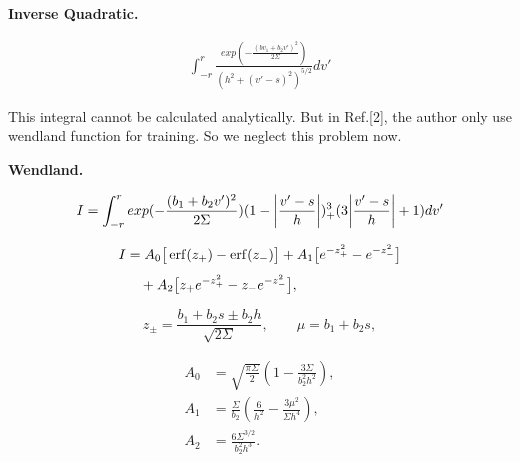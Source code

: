 \documentclass{article}
\begin{document}
	
	\textbf{Inverse Quadratic.}
	
	\begin{align}
	\int_{-r}^r\frac{exp(-\frac{(bv_1+b_2v')^2}{2\Sigma})}{(h^2+(v'-s)^2)^{5/2}}dv'
    \end{align}
    
    This integral cannot be calculated analytically. But in Ref.[2], the author only use wendland function for training. So we neglect this problem now.
     
    \textbf{Wendland.}

	\begin{align}
	I=\int_{-r}^rexp(-\frac{(b_1+b_2v')^2}{2\Sigma})(1-\abs{\frac{v'-s}{h}})^3_+(3\abs{\frac{v'-s}{h}}+1)dv'
    \end{align}

	\begin{equation}
		\begin{aligned}
			I
			&=
			A_0
			\big[
			\erf(z_+)-\erf(z_-)
			\big]
			+
			A_1
			\big[
			e^{-z_+^2}-e^{-z_-^2}
			\big]
			\\[4pt]
			&\quad+
			A_2
			\big[
			z_+ e^{-z_+^2}-z_- e^{-z_-^2}
			\big],
		\end{aligned}
	\end{equation}
	
	\[
	z_\pm=\frac{b_1+b_2 s\pm b_2 h}{\sqrt{2\Sigma}},
	\qquad
	\mu=b_1+b_2 s,
	\]
	
	\[
	\begin{aligned}
		A_0 &=
		\sqrt{\frac{\pi\Sigma}{2}}
		\left(
		1-\frac{3\Sigma}{b_2^2 h^2}
		\right),\\
		A_1 &=
		\frac{\Sigma}{b_2}
		\left(
		\frac{6}{h^2}-\frac{3\mu^2}{\Sigma h^4}
		\right),\\
		A_2 &=
		\frac{6\Sigma^{3/2}}{b_2^2 h^3}.
	\end{aligned}
	\]
	
\end{document}

